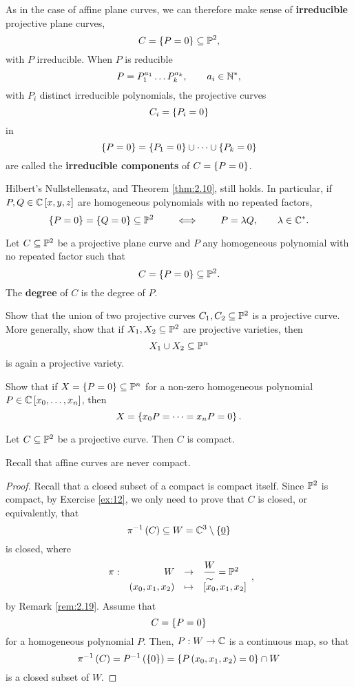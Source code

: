 \begin{remark}
As in the case of affine plane curves, we can therefore make sense of \textbf{irreducible} projective plane curves,
$$ C = \cb{P = 0} \subseteq \P^2, $$
with $ P $ irreducible. When $ P $ is reducible
$$ P = P_1^{a_1} \dots P_k^{a_k}, \qquad a_i \in \N^*, $$
with $ P_i $ distinct irreducible polynomials, the projective curves
$$ C_i = \cb{P_i = 0} $$
in
$$ \cb{P = 0} = \cb{P_1 = 0} \cup \dots \cup \cb{P_k = 0} $$
are called the \textbf{irreducible components} of $ C = \cb{P = 0} $.
\end{remark}

\pagebreak

\begin{remark}
\label{rem:4.12}
Hilbert's Nullstellensatz, and Theorem \ref{thm:2.10}, still holds. In particular, if $ P, Q \in \C\sb{x, y, z} $ are homogeneous polynomials with no repeated factors,
$$ \cb{P = 0} = \cb{Q = 0} \subseteq \P^2 \qquad \iff \qquad P = \lambda Q, \qquad \lambda \in \C^*. $$
\end{remark}

\begin{definition}
Let $ C \subseteq \P^2 $ be a projective plane curve and $ P $ any homogeneous polynomial with no repeated factor such that
$$ C = \cb{P = 0} \subseteq \P^2. $$
The \textbf{degree} of $ C $ is the degree of $ P $.
\end{definition}

\begin{exercise}
Show that the union of two projective curves $ C_1, C_2 \subseteq \P^2 $ is a projective curve. More generally, show that if $ X_1, X_2 \subseteq \P^2 $ are projective varieties, then
$$ X_1 \cup X_2 \subseteq \P^n $$
is again a projective variety.
\end{exercise}

\begin{exercise}
Show that if $ X = \cb{P = 0} \subseteq \P^n $ for a non-zero homogeneous polynomial $ P \in \C\sb{x_0, \dots, x_n} $, then
$$ X = \cb{x_0P = \dots = x_nP = 0}. $$
\end{exercise}

\begin{lemma}
Let $ C \subseteq \P^2 $ be a projective curve. Then $ C $ is compact.
\end{lemma}

Recall that affine curves are never compact.

\begin{proof}
Recall that a closed subset of a compact is compact itself. Since $ \P^2 $ is compact, by Exercise \ref{ex:12}, we only need to prove that $ C $ is closed, or equivalently, that
$$ \pi^{-1}\rb{C} \subseteq W = \C^3 \setminus \cb{\underline{0}} $$
is closed, where
$$ \function[\pi]{W}{\dfrac{W}{\sim} = \P^2}{\rb{x_0, x_1, x_2}}{\sb{x_0, x_1, x_2}}, $$
by Remark \ref{rem:2.19}. Assume that
$$ C = \cb{P = 0} $$
for a homogeneous polynomial $ P $. Then, $ P : W \to \C $ is a continuous map, so that
$$ \pi^{-1}\rb{C} = P^{-1}\rb{\cb{0}} = \cb{P\rb{x_0, x_1, x_2} = 0} \cap W $$
is a closed subset of $ W $.
\end{proof}

